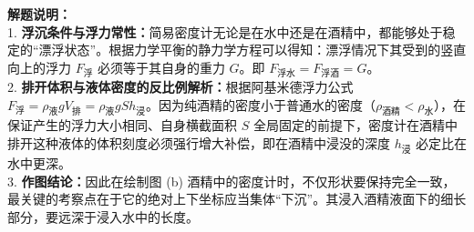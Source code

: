 \begin{center}
\end{center}

\vspace{0.6cm}

{\small\color{gray}
\textbf{解题说明：}\\
1. \textbf{浮沉条件与浮力常性：}简易密度计无论是在水中还是在酒精中，都能够处于稳定的“漂浮状态”。根据力学平衡的静力学方程可以得知：漂浮情况下其受到的竖直向上的浮力 $F_{\text{浮}}$ 必须等于其自身的重力 $G$。即 $F_{\text{浮水}} = F_{\text{浮酒}} = G$。\\
2. \textbf{排开体积与液体密度的反比例解析：}根据阿基米德浮力公式 $F_{\text{浮}} = \rho_{\text{液}} g V_{\text{排}} = \rho_{\text{液}} g S h_{\text{浸}}$。因为纯酒精的密度小于普通水的密度（$\rho_{\text{酒精}} < \rho_{\text{水}}$），在保证产生的浮力大小相同、自身横截面积 $S$ 全局固定的前提下，密度计在酒精中排开这种液体的体积刻度必须强行增大补偿，即在酒精中浸没的深度 $h_{\text{浸}}$ 必定比在水中更深。\\
3. \textbf{作图结论：}因此在绘制图 (b) 酒精中的密度计时，不仅形状要保持完全一致，最关键的考察点在于它的绝对上下坐标应当集体“下沉”。其浸入酒精液面下的细长部分，要远深于浸入水中的长度。
}

\vspace{0.6cm}


